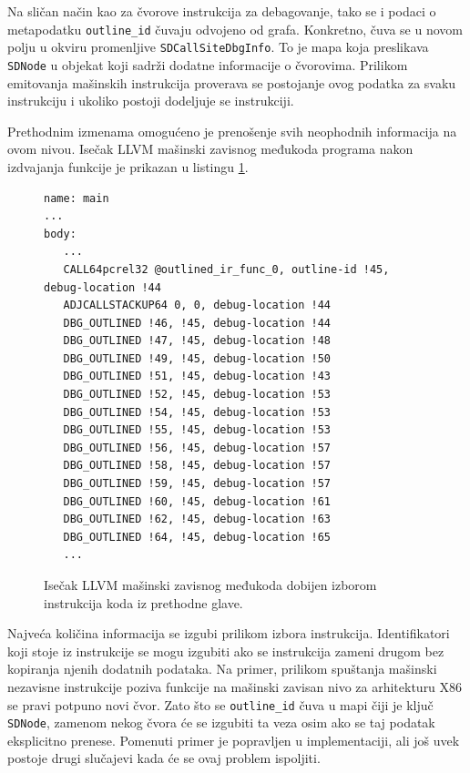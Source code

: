 \documentclass[12pt,oneside]{memoir}
\begin{document}
Na sličan način kao za čvorove instrukcija za debagovanje, tako se i podaci o metapodatku \verb|outline_id| čuvaju odvojeno od grafa.
Konkretno, čuva se u novom polju u okviru promenljive \verb|SDCallSiteDbgInfo|. %
To je mapa koja preslikava \verb|SDNode| u objekat koji sadrži dodatne informacije o čvorovima.
Prilikom emitovanja mašinskih instrukcija proverava se postojanje ovog podatka za svaku instrukciju i ukoliko postoji dodeljuje se instrukciji.


Prethodnim izmenama omogućeno je prenošenje svih neophodnih informacija na ovom nivou.
Isečak LLVM mašinski zavisnog međukoda programa nakon izdvajanja funkcije je prikazan u listingu \ref{lst:outlining_mir_example}.

\begin{figure}[!ht]
\begin{verbatim}
name: main
...
body:
   ...
   CALL64pcrel32 @outlined_ir_func_0, outline-id !45, debug-location !44
   ADJCALLSTACKUP64 0, 0, debug-location !44
   DBG_OUTLINED !46, !45, debug-location !44
   DBG_OUTLINED !47, !45, debug-location !48
   DBG_OUTLINED !49, !45, debug-location !50
   DBG_OUTLINED !51, !45, debug-location !43
   DBG_OUTLINED !52, !45, debug-location !53
   DBG_OUTLINED !54, !45, debug-location !53
   DBG_OUTLINED !55, !45, debug-location !53
   DBG_OUTLINED !56, !45, debug-location !57
   DBG_OUTLINED !58, !45, debug-location !57
   DBG_OUTLINED !59, !45, debug-location !57
   DBG_OUTLINED !60, !45, debug-location !61
   DBG_OUTLINED !62, !45, debug-location !63
   DBG_OUTLINED !64, !45, debug-location !65
   ...
\end{verbatim}
\caption{Isečak LLVM mašinski zavisnog međukoda dobijen izborom instrukcija koda iz prethodne glave.}
\label{lst:outlining_mir_example}
\end{figure}

Najveća količina informacija se izgubi prilikom izbora instrukcija.
Identifikatori koji stoje iz instrukcije se mogu izgubiti ako se instrukcija zameni drugom bez kopiranja njenih dodatnih podataka.
Na primer, prilikom spuštanja mašinski nezavisne instrukcije poziva funkcije na mašinski zavisan nivo za arhitekturu X86 se pravi potpuno novi čvor.
Zato što se \verb|outline_id| čuva u mapi čiji je ključ \verb|SDNode|, zamenom nekog čvora će se izgubiti ta veza osim ako se taj podatak eksplicitno prenese.
Pomenuti primer je popravljen u implementaciji, ali još uvek postoje drugi slučajevi kada će se ovaj problem ispoljiti.
\end{document}
